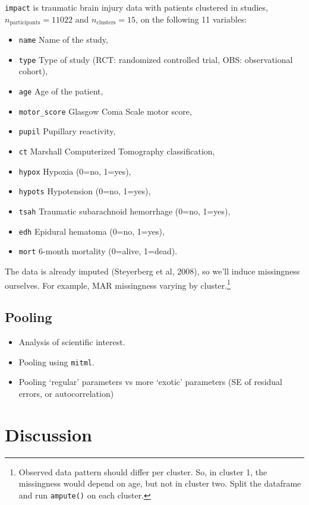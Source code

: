 \documentclass[
]{jss}
\providecommand{\tightlist}{%
  \setlength{\itemsep}{0pt}\setlength{\parskip}{0pt}}
\begin{document}
\texttt{impact} is traumatic brain injury data with patients clustered
in studies, \(n_{\text{participants}} = 11022\) and
\(n_{\text{clusters}} = 15\), on the following 11 variables:

\begin{itemize}
\tightlist
\item
  \texttt{name} Name of the study,
\item
  \texttt{type} Type of study (RCT: randomized controlled trial, OBS:
  observational cohort),
\item
  \texttt{age} Age of the patient,
\item
  \texttt{motor\_score} Glasgow Coma Scale motor score,
\item
  \texttt{pupil} Pupillary reactivity,
\item
  \texttt{ct} Marshall Computerized Tomography classification,
\item
  \texttt{hypox} Hypoxia (0=no, 1=yes),
\item
  \texttt{hypots} Hypotension (0=no, 1=yes),
\item
  \texttt{tsah} Traumatic subarachnoid hemorrhage (0=no, 1=yes),
\item
  \texttt{edh} Epidural hematoma (0=no, 1=yes),
\item
  \texttt{mort} 6-month mortality (0=alive, 1=dead).
\end{itemize}

The data is already imputed (Steyerberg et al, 2008), so we'll induce
missingness ourselves. For example, MAR missingness varying by
cluster.\footnote{Observed data pattern should differ per cluster. So,
  in cluster 1, the missingness would depend on age, but not in cluster
  two. Split the dataframe and run \texttt{ampute()} on each cluster.}

\hypertarget{pooling}{%
\subsection{Pooling}\label{pooling}}

\begin{itemize}
\item
  Analysis of scientific interest.
\item
  Pooling using \texttt{mitml}.
\item
  Pooling `regular' parameters vs more `exotic' parameters (SE of
  residual errors, or autocorrelation)
\end{itemize}

\hypertarget{discussion}{%
\section{Discussion}\label{discussion}}
\end{document}
